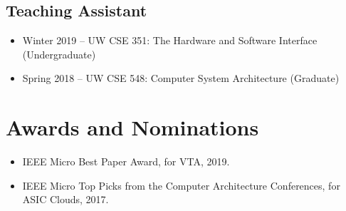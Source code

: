 \documentclass[10pt]{article}
\begin{document}
\subsection*{Teaching Assistant}

\begin{itemize}
  \item Winter 2019 -- UW CSE 351: The Hardware and Software Interface (Undergraduate)
  \item Spring 2018 -- UW CSE 548: Computer System Architecture (Graduate)
\end{itemize}

\section*{Awards and Nominations}

\begin{itemize}
  \item IEEE Micro Best Paper Award, for VTA, 2019.
  \item IEEE Micro Top Picks from the Computer Architecture Conferences, for ASIC Clouds, 2017.
\end{itemize}
\end{document}
